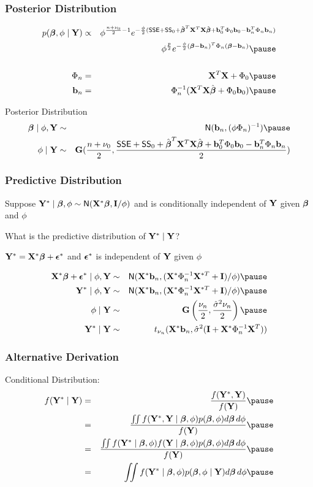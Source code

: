 \documentclass[handout]{beamer}\usepackage[]{graphicx}\usepackage[]{color}
\begin{document}
\begin{frame} \frametitle{Posterior Distribution}
  \begin{eqnarray*}
 p(\b, \phi \mid \Y) &\propto&
  \phi^{\frac {n +  \nu_0}{ 2} - 1}
 e^{- \frac \phi 2 ( \SSE + \SS_0  + \bhat^T \X^T\X \bhat + \bv_0^T \Phi_0 \bv_0
 - \bv_n^T \Phi_n \bv_n)} \\
& & \phi^{\frac p 2} e^{- \frac{\phi}{2} (\b - \bv_n)^T \Phi_n (\b -
  \bv_n) }  \pause  \\
& & \\
\Phi_n & = & \X^T\X +  \Phi_0 \pause \\
\bv_n &  = & \Phi_n^{-1} (\X^T\X \bhat  + \Phi_0 \bv_0) \pause
  \end{eqnarray*}

Posterior Distribution
  \begin{eqnarray*}
\b \mid \phi, \Y & \sim &\N(\bv_n, (\phi \Phi_n)^{-1}) \pause \\
\phi \mid \Y &\sim &\G(\frac{n + \nu_0}{2}, \frac{\SSE + \SS_0 + \bhat^T \X^T\X \bhat + \bv_0^T \Phi_0 \bv_0
 - \bv_n^T \Phi_n \bv_n}{2})
  \end{eqnarray*}


\end{frame}



\begin{frame}
  \frametitle{Predictive Distribution}
Suppose $\mathbf{Y}^* \mid \boldsymbol{\beta}, \phi \sim \textsf{N}(\mathbf{X}^* \boldsymbol{\beta} , \mathbf{I}/\phi)$  and is conditionally
independent of $\mathbf{Y}$ given $\boldsymbol{\beta}$ and $\phi$ \pause
\vspace{18pt}

What is the predictive distribution of $\mathbf{Y}^* \mid \mathbf{Y}$? \pause

\vspace{18pt}
$\mathbf{Y}^* = \mathbf{X}^* \boldsymbol{\beta} + \boldsymbol{\epsilon}^*$ and $\boldsymbol{\epsilon}^*$ is independent of $\mathbf{Y}$ given
$\phi$ \pause

\begin{eqnarray*}
\X^* \b + \eps^* \mid \phi, \Y & \sim & \N(\X^*\bv_n, (\X^{*} \Phi_n^{-1} \X^{*T}
+ \I)/\phi)  \pause \\
\Y^* \mid \phi, \Y & \sim & \N(\X^*\bv_n, (\X^{*} \Phi_n^{-1} \X^{*T}
+ \I)/\phi)  \pause \\
\phi \mid \Y & \sim & \G\left(\frac{\nu_n}{2},
  \frac{\shat \nu_n}{ 2} \right)  \pause \\
\Y^* \mid \Y & \sim & t_{\nu_n}( \X^*\bv_n, \shat (\I + \X^* \Phi_n^{-1} \X^T))
\end{eqnarray*}
\end{frame}
\begin{frame}
  \frametitle{Alternative Derivation}
Conditional Distribution:
\begin{eqnarray*}
f(\Y^* \mid \Y) & = & \frac{f(\Y^*, \Y)}{f(\Y)} \pause \\
 & = & \frac{
\iint f(\Y^*, \Y \mid \b, \phi) p(\b, \phi) d\b\, d\phi
}
{
  f(\Y)
}  \pause \\
 & = & \frac{
\iint f(\Y^*\mid \b, \phi) f(\Y \mid \b, \phi) p(\b, \phi) d\b\, d\phi
}
{
  f(\Y)
}  \pause \\
 & = &
\iint f(\Y^*\mid \b, \phi)  p(\b, \phi \mid \Y) d\b\, d\phi \pause
\end{eqnarray*}
\end{frame}
\end{document}
